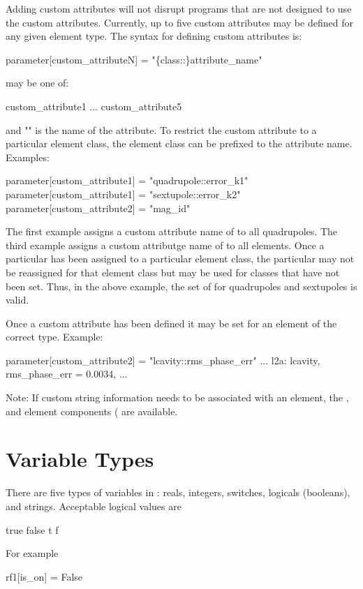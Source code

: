 {{Adding custom attributes will not disrupt programs that are not
designed to use the custom attributes. Currently, up to five custom
attributes may be defined for any given element type. The syntax for
defining custom attributes is:
\begin{example}
  parameter[custom_attributeN] = "\{class::\}attribute_name"
\end{example}
 may be one of:
\begin{example}
  custom_attribute1
  ...
  custom_attribute5
\end{example}
and "" is the name of the attribute. To restrict the
custom attribute to a particular element class, the element class
can be prefixed to the attribute name. Examples:
\begin{example}
  parameter[custom_attribute1] = "quadrupole::error_k1"
  parameter[custom_attribute1] = "sextupole::error_k2"
  parameter[custom_attribute2] = "mag_id"
\end{example}
The first example assigns a custom attribute name of  to all
quadrupoles.  The third example assigns a custom attributge name of
 to all elements. Once a particular 
has been assigned to a particular element class, the particular
 may not be reassigned for that element class
but may be used for classes that have not been set. Thus, in the above
example, the set of  for quadrupoles and
sextupoles is valid.

Once a custom attribute has been defined it may be set for an element
of the correct type. Example:
\begin{example}
  parameter[custom_attribute2] = "lcavity::rms_phase_err"
  ...
  l2a: lcavity, rms_phase_err = 0.0034, ...
\end{example}

Note: If custom string information needs to be associated with an
element, the ,  and  element components
( are available.

\section{Variable Types}
\label{s:var.types}

There are five types of variables in \bmad: reals, integers, switches,
logicals (booleans), and strings. Acceptable logical values are
\begin{example}
   true    false
   t       f
\end{example}
For example
\begin{example}
  rf1[is_on] = False
\end{example}

}}
